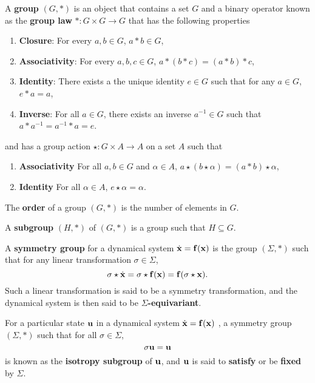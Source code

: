 \begin{define}\cite{Rotman1995}
A {\bf group} $(G,\ast)$ is an object that contains a set $G$ and a binary operator known as the {\bf group law} $\ast: G \times G \to G$ that has the following properties 
\begin{enumerate}
\item {\bf Closure}: For every $a,b\in G$, $a \ast b \in G$,
\item {\bf Associativity}: For every $a,b,c \in G$, $a \ast (b\ast c) = (a\ast b)\ast c$,
\item {\bf Identity}: There exists a the unique identity $e \in G$ such that for any $a \in G$, $e\ast a = a$,
\item {\bf Inverse}: For all $a\in G$, there exists an inverse $a^{-1} \in G$ such that $a \ast a^{-1}=a^{-1}\ast a = e$.
\end{enumerate}
and has a group action $\star: G\times A \to A$ on a set $A$ such that 
\begin{enumerate}
\item {\bf Associativity} For all $a,b \in G$ and $\alpha \in A$, $a\star(b\star\alpha) =  (a \ast b)\star \alpha$,
\item {\bf Identity} For all $\alpha \in A$, $e \star \alpha = \alpha$.
\end{enumerate}
\end{define}
\begin{define}
The {\bf order} of a group $(G,\ast)$ is the number of elements in $G$. 
\end{define}
\begin{define}
A {\bf subgroup} $(H,\ast)$ of $(G,\ast)$ is a group such that $H \subseteq G$.  
\end{define}
\begin{define}\label{def:equivariance}
A {\bf symmetry group} for a dynamical system $\dot{\mathbf{x}} = \mathbf{f}(\mathbf{x})$  is the group $(\Sigma,\ast)$ such that for any linear transformation $\sigma \in \Sigma$, 
\begin{equation}
\sigma\star \dot{\mathbf{x}} = \sigma\star \mathbf{f}(\mathbf{x}) = \mathbf{f}(\sigma \star \mathbf{x}).
\end{equation}
Such a linear transformation is said to be a symmetry transformation, and the dynamical system is then said to be {\bf $\Sigma$-equivariant}.
\end{define}
\begin{define}
For a particular state $\mathbf{u}$ in a dynamical system $\dot{\mathbf{x}} = \mathbf{f}(\mathbf{x})$ , a symmetry group $(\Sigma,\ast)$ such that for all $\sigma \in \Sigma$,
\begin{equation}
\sigma \mathbf{u}  = \mathbf{u}
\end{equation}
is known as the {\bf isotropy subgroup} of $\mathbf{u}$, and $\mathbf{u}$ is said to {\bf satisfy} or be {\bf fixed} by $\Sigma$. 
\end{define}
